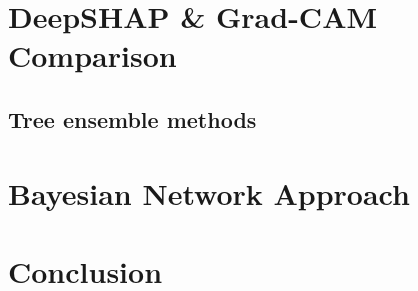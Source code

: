 \section{DeepSHAP & Grad-CAM Comparison}

\subsection{Tree ensemble methods}


\section{Bayesian Network Approach}


\section{Conclusion}